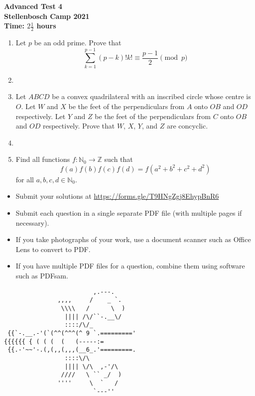 \documentclass{article}
\begin{document}
\thispagestyle{empty}

\begin{center}
  \textbf{\Large Advanced Test 4}
  \\ \vspace{1em}
  \textbf{\large Stellenbosch Camp 2021}
  \\ \vspace{1em}
  \textbf{\large Time: $2\frac{1}{2}$ hours}
\end{center}

\bigskip

\begin{enumerate}[itemsep=\fill]

\item %
Let $p$ be an odd prime. Prove that
\[
	\sum_{k=1}^{p-1} (p-k)!k! \equiv \frac{p-1}{2} \pmod{p}
\]


\item %


\item %
Let $ABCD$ be a convex quadrilateral with an inscribed circle whose centre is $O$. Let $W$ and $X$ be the feet of the perpendiculars from $A$ onto $OB$ and $OD$ respectively. Let $Y$ and $Z$ be the feet of the perpendiculars from $C$ onto $OB$ and $OD$ respectively. Prove that $W$, $X$, $Y$, and $Z$ are concyclic.

\item %


\item %
Find all functions $f : \mathbb{N}_0 \to \mathbb{Z}$ such that
\[
  f(a) f(b) f(c) f(d) = f\left(a^2 + b^2 + c^2 + d^2\right)
\]
for all $a, b, c, d \in \mathbb{N}_0$.

\end{enumerate}


\vfill
\begin{itemize}
	\item Submit your solutions at \href{https://forms.gle/T9HNgZgj8EhypBnR6}{https://forms.gle/T9HNgZgj8EhypBnR6}
	\item Submit each question in a single separate PDF file (with multiple pages if necessary).
	\item If you take photographs of your work, use a document scanner such as Office Lens to convert to PDF.
	\item If you have multiple PDF files for a question, combine them using software such as PDFsam.
\end{itemize}

\vfill
\centering
\small
\begin{BVerbatim}
                         ,.---.   
               ,,,,     /    _ `.
                \\\\   /      \  )
                 |||| /\/``-.__\/
                 ::::/\/_
 {{`-.__.-'(`(^^(^^^(^ 9 `.========='
{{{{{{ { ( ( (  (   (-----:=
 {{.-'~~'-.(,(,,(,,,(__6_.'=========.
                 ::::\/\ 
                 |||| \/\  ,-'/\
                ////   \ `` _/  )
               ''''     \  `   /
                         `---''
\end{BVerbatim}
\end{document}
